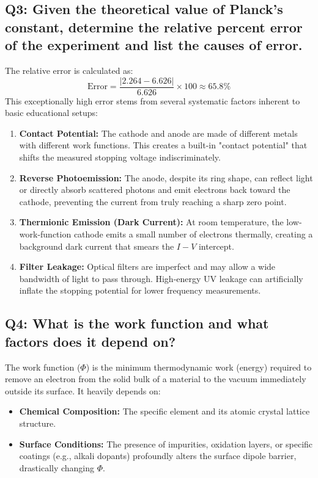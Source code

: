 \documentclass[a4paper,11pt]{article}
\begin{document}
\subsection*{Q3: Given the theoretical value of Planck's constant, determine the relative percent error of the experiment and list the causes of error.}
The relative error is calculated as:
\begin{equation}
    \text{Error} = \frac{|2.264 - 6.626|}{6.626} \times 100 \approx 65.8\%
\end{equation}
This exceptionally high error stems from several systematic factors inherent to basic educational setups:
\begin{enumerate}
    \item \textbf{Contact Potential:} The cathode and anode are made of different metals with different work functions. This creates a built-in "contact potential" that shifts the measured stopping voltage indiscriminately.
    \item \textbf{Reverse Photoemission:} The anode, despite its ring shape, can reflect light or directly absorb scattered photons and emit electrons back toward the cathode, preventing the current from truly reaching a sharp zero point.
    \item \textbf{Thermionic Emission (Dark Current):} At room temperature, the low-work-function cathode emits a small number of electrons thermally, creating a background dark current that smears the $I-V$ intercept.
    \item \textbf{Filter Leakage:} Optical filters are imperfect and may allow a wide bandwidth of light to pass through. High-energy UV leakage can artificially inflate the stopping potential for lower frequency measurements.
\end{enumerate}

\subsection*{Q4: What is the work function and what factors does it depend on?}
The work function ($\Phi$) is the minimum thermodynamic work (energy) required to remove an electron from the solid bulk of a material to the vacuum immediately outside its surface. It heavily depends on:
\begin{itemize}
    \item \textbf{Chemical Composition:} The specific element and its atomic crystal lattice structure.
    \item \textbf{Surface Conditions:} The presence of impurities, oxidation layers, or specific coatings (e.g., alkali dopants) profoundly alters the surface dipole barrier, drastically changing $\Phi$.
\end{itemize}
\end{document}
